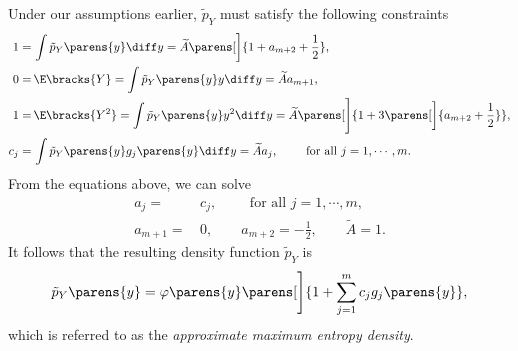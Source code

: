 \documentclass[12pt]{article}
\begin{document}
\begin{enumerate}[label=\textbf{\arabic*.}]
	Under our assumptions earlier, $\tilde{p}_Y$ must satisfy the following constraints 
	\begin{align*}
		1 = & \, \int \tilde{p}_Y \parens{y} \diff y = \widetilde{A} \parens[\bigg]{1 + a_{m+2} + \frac{1}{2}}, \\ 
		0 = & \, \E \bracks{Y} = \int \tilde{p}_Y \parens{y} y \diff y = \widetilde{A} a_{m+1}, \\ 
		1 = & \, \E \bracks{Y^2} = \int \tilde{p}_Y \parens{y} y^2 \diff y = \widetilde{A} \parens[\Bigg]{1 + 3 \parens[\bigg]{a_{m+2} + \frac{1}{2}}}, \\ 
		c_j = & \, \int \tilde{p}_Y \parens{y} g_j \parens{y} \diff y = \widetilde{A} a_j, \qquad \text{ for all } j = 1, \cdots, m. 
	\end{align*}
	From the equations above, we can solve 
	\begin{align*}
		a_j = & \, c_j, \qquad \text{ for all } j = 1, \cdots, m, \\ 
		a_{m+1} = & \, 0, \qquad a_{m+2} = -\frac{1}{2}, \qquad \widetilde{A} = 1. 
	\end{align*}
	It follows that the resulting density function $\tilde{p}_Y$ is 
	\begin{align}
		\tilde{p}_Y \parens{y} = \varphi \parens{y} \parens[\Bigg]{1 + \sum_{j=1}^m c_j g_j \parens{y}}, 
	\end{align}
	which is referred to as the \emph{approximate maximum entropy density}. 
	

\end{enumerate}
\end{document}
